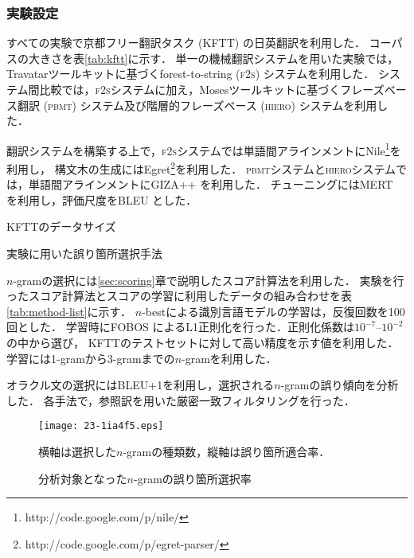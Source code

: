 \documentclass[japanese]{jnlp_1.4}
\newcommand{\textcolor}[2]{}
\begin{document}
\subsubsection{実験設定}

すべての実験で京都フリー翻訳タスク (KFTT) \cite{neubig11kftt}の日英翻訳を利用した．
コーパスの大きさを表\ref{tab:kftt}に示す．
単一の機械翻訳システムを用いた実験では，Travatarツールキット\cite{neubig13travatar}に基づくforest-to-string (\textsc{f2s}) システムを利用した．
システム間比較では，\textsc{f2s}システムに加え，Mosesツールキット\cite{koehn07moses}に基づくフレーズベース翻訳 (\textsc{pbmt}) システム及び階層的フレーズベース (\textsc{hiero}) システムを利用した．

翻訳システムを構築する上で，\textsc{f2s}システムでは単語間アラインメントにNile\footnote{http://code.google.com/p/nile/}を利用し，
構文木の生成にはEgret\footnote{http://code.google.com/p/egret-parser/}を利用した．
\textsc{pbmt}システムと\textsc{hiero}システムでは，単語間アラインメントにGIZA++ \cite{och03alignment}を利用した．
チューニングにはMERT \cite{och03mert}を利用し，評価尺度をBLEU \cite{papineni02bleu}とした．

\begin{table}[b]
\caption{KFTTのデータサイズ}
\label{tab:kftt} 

\end{table}
\begin{table}[b]
\caption{実験に用いた誤り箇所選択手法}
\label{tab:method-list}

\end{table}

$n$-gramの選択には\ref{sec:scoring}章で説明したスコア計算法を利用した．
実験を行ったスコア計算法とスコアの学習に利用したデータの組み合わせを表\ref{tab:method-list}に示す．
$n$-bestによる識別言語モデルの学習は，反復回数を100回とした．
学習時にFOBOS \cite{duchi09fobos}によるL1正則化を行った．正則化係数は$10^{-7}$--$10^{-2}$の中から選び，
KFTTのテストセットに対して高い精度を示す値を利用した．
学習には1-gramから3-gramまでの$n$-gramを\textcolor{black}{長さによる区別を行わずに}利用した．

オラクル文の選択にはBLEU+1を利用し，選択される$n$-gramの誤り傾向を分析した．
各手法で，参照訳を用いた厳密一致フィルタリングを行った．

\begin{figure}[b]
\begin{center}
\texttt{[image: 23-1ia4f5.eps]}
\end{center}
\caption{分析対象となった$n$-gramの誤り箇所選択率}
\small\centerline{横軸は選択した$n$-gramの種類数，縦軸は誤り箇所適合率．}
\label{fig:precision}
\end{figure}
\end{document}
